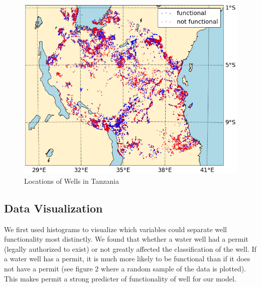 \documentclass[10pt]{SelfArx} %
\begin{document}
\setlength{\abovecaptionskip}{15pt plus 3pt minus 2pt}


\setlength{\belowcaptionskip}{-13pt}
\begin{figure}[ht]\centering
\includegraphics[width=\linewidth]{location.png}
\caption{Locations of Wells in Tanzania}
\label{fig:map}
\end{figure}


\subsection{Data Visualization}

We first used histograms to visualize which variables could separate well functionality most distinctly. We found that whether a water well had a permit (legally authorized to exist) or not greatly affected the classification of the well. If a water well has a permit, it is much more likely to be functional than if it does not have a permit (see figure 2 where a random sample of the data is plotted). This makes permit a strong predicter of functionality of well for our model.
\\[-1.5\baselineskip]
\break
\end{document}
